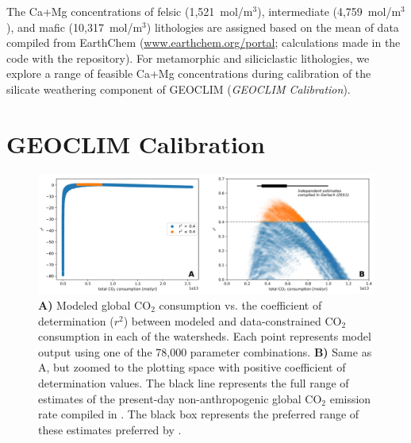 \documentclass[11pt,letterpaper]{article}
\newcommand{\COtwo}{CO$_{2}$\xspace}
\begin{document}
The Ca+Mg concentrations of felsic (1,521~mol/m$^{3}$), intermediate (4,759~mol/m$^{3}$), and mafic (10,317~mol/m$^{3}$) lithologies are assigned based on the mean of data compiled from EarthChem (\url{www.earthchem.org/portal}; calculations made in the code with the repository). For metamorphic and siliciclastic lithologies, we explore a range of feasible Ca+Mg concentrations during calibration of the silicate weathering component of GEOCLIM (\textit{GEOCLIM Calibration}).

\section*{GEOCLIM Calibration}

\begin{figure}[h!]
    \centering
    \includegraphics[width=1\textwidth]{Manuscript/Figures/W_vs_r2.jpg}
    \caption{\textbf{A)} Modeled global \COtwo consumption vs. the coefficient of determination ($r^{2}$) between modeled and data-constrained \COtwo consumption in each of the watersheds. Each point represents model output using one of the 78,000 parameter combinations. \textbf{B)} Same as A, but zoomed to the plotting space with positive coefficient of determination values. The black line represents the full range of estimates of the present-day non-anthropogenic global CO$_{2}$ emission rate compiled in \citet{Gerlach2011a}. The black box represents the preferred range of these estimates preferred by \citet{Gerlach2011a}.}
    \label{fig:W_vs_r2}
\end{figure}
\end{document}
